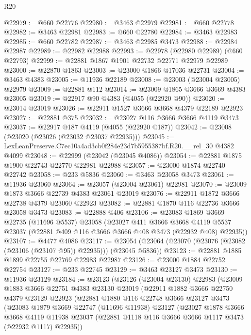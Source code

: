 \begin{lexlean}{R20}
\begin{coremodule}
@22979 := @660 @22776
@22980 := @3463 @22979
@22981 := @660 @22778
@22982 := @3463 @22981
@22983 := @660 @22780
@22984 := @3463 @22983
@22985 := @660 @22782
@22987 := @3463 @22985 @3473
@22988 := @22984 @22987
@22989 := @22982 @22988
@22993 := @22978 (@22980 @22989) (@660 @22793)
@22999 := @22881 @1867 @1901 @22732 @22771 @22979 @22989
@23000 := @22870 @1863
@23003 := @23000 @1866 @17036 @22731
@23004 := @3463 @4383
@23005 := @11936 @22189
@23008 := @23003 (@23004 @23005) @22979
@23009 := @22881 @112
@23014 := @23009 @1865 @3666 @3669 @4383 @23005
@23019 := @22917 @90 @4383 (@4055 (@22920 @90))
@23020 := @23014 @23019
@23026 := @22911 @1527 @3666 @3668 @4379 @22189 @22923
@23027 := @22881 @375
@23032 := @23027 @116 @3666 @3666 @4119 @3473
@23037 := @22917 @187 @4119 (@4055 (@22920 @187))
@23042 := @23008 (@23020 (@23026 (@23032 @23037 @22935)))
@23045 := LexLeanPreserve.C7ec10a4ad3cb0f284e23d7b5955387bf.R20.__rel_30 @4382 @4099
@23048 := @22999 (@23042 (@23045 @4086))
@23054 := @22881 @1875 @1900 @22743 @22770 @22981 @22988
@23057 := @23000 @1874 @22740 @22742
@23058 := @233 @5836
@23060 := @3463 @23058 @3473
@23061 := @11936 @23060
@23064 := @23057 (@23004 @23061) @22981
@23070 := @23009 @1873 @3666 @22739 @4383 @23061 @23019
@23076 := @22911 @1872 @3666 @22738 @4379 @23060 @22923
@23082 := @22881 @1870 @116 @22736 @3666 @23058 @3473
@23083 := @22888 @406
@23106 := @23083
    @1869
    @3669
    @22735
    (@11696 @5537)
    @23058
    (@23027
      @411
      @3666
      @3668
      @4119
      @5537
      @23037
      (@22881 @409 @116 @3666 @3666 @408 @3473 (@22932 @408) @22935))
@23107 := @4477 @4086
@23117 := @23054 (@23064 (@23070 (@23076 (@23082 (@23106 (@23107 @95)) @22935))) (@23045 @5836))
@23123 := @22881 @1885 @1899 @22755 @22769 @22983 @22987
@23126 := @23000 @1884 @22752 @22754
@23127 := @233 @22745
@23129 := @3463 @23127 @3473
@23130 := @11936 @23129
@23184 := @23123
    (@23126
      (@23004 @23130)
      @22983
      (@23009
        @1883
        @3666
        @22751
        @4383
        @23130
        @23019
        (@22911
          @1882
          @3666
          @22750
          @4379
          @23129
          @22923
          (@22881
            @1880
            @116
            @22748
            @3666
            @23127
            @3473
            (@23083
              @1879
              @3669
              @22747
              (@11696 @11938)
              @23127
              (@23027
                @1878
                @3666
                @3668
                @4119
                @11938
                @23037
                (@22881 @1118 @116 @3666 @3666 @1117 @3473 (@22932 @1117) @22935))

\end{coremodule}
\end{lexlean}
